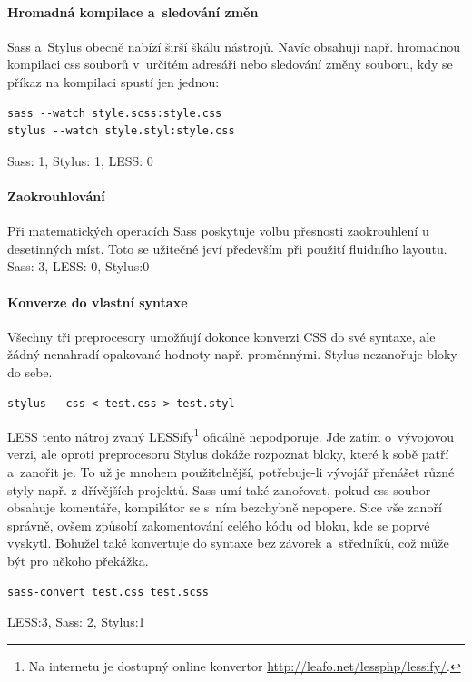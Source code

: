 \documentclass[thesis=B,czech]{FITthesis}[2012/06/26]
\begin{document}
\paragraph{Hromadná kompilace a~sledování změn}

 Sass a~Stylus obecně nabízí širší škálu nástrojů. Navíc obsahují např. hromadnou kompilaci css souborů v~určitém adresáři nebo sledování změny souboru, kdy se příkaz na kompilaci spustí jen jednou:
\scriptsize
\begin{verbatim}
sass --watch style.scss:style.css
stylus --watch style.styl:style.css
\end{verbatim}
\normalsize
Sass: 1, Stylus: 1, LESS: 0

\paragraph{Zaokrouhlování}

 Při matematických operacích Sass poskytuje volbu přesnosti zaokrouhlení u desetinných míst. Toto se užitečné jeví především při použití fluidního layoutu.
Sass: 3, LESS: 0, Stylus:0
\paragraph{Konverze do vlastní syntaxe}

 Všechny tři preprocesory umožňují dokonce konverzi CSS do své syntaxe, ale žádný nenahradí opakované hodnoty např. proměnnými. Stylus nezanořuje bloky do sebe.
\scriptsize
\begin{verbatim}
stylus --css < test.css > test.styl
\end{verbatim}
\normalsize
LESS tento nátroj zvaný LESSify\footnote{Na internetu je dostupný online konvertor \url{http://leafo.net/lessphp/lessify/}.} oficálně nepodporuje. Jde zatím o~vývojovou verzi, ale oproti preprocesoru Stylus dokáže rozpoznat bloky, které k sobě patří a~zanořit je. To už je mnohem použitelnější, potřebuje-li vývojář přenášet různé styly např. z dřívějších projektů. 
Sass umí také zanořovat, pokud css soubor obsahuje komentáře, kompilátor se s~ním bezchybně nepopere. Sice vše zanoří správně, ovšem způsobí zakomentování celého kódu od bloku, kde se poprvé vyskytl. Bohužel také konvertuje do syntaxe bez závorek a~středníků, což může být pro někoho překážka. 

\scriptsize
\begin{verbatim}
sass-convert test.css test.scss
\end{verbatim}
\normalsize
LESS:3, Sass: 2, Stylus:1
\end{document}
